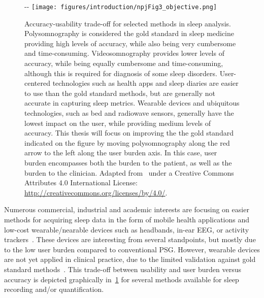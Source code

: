 \begin{figure}
\begin{adjustwidth*}{}{-\marginparwidth-\marginparsep}
    \centering
    \texttt{[image: figures/introduction/npjFig3\_objective.png]}
    \caption[Accuracy-usability trade-off in sleep analysis]{Accuracy-usability trade-off for selected methods in sleep analysis. Polysomnography is considered the gold standard in sleep medicine providing high levels of accuracy, while also being very cumbersome and time-consuming. Videosomnography provides lower levels of accuracy, while being equally cumbersome and time-consuming, although this is required for diagnosis of some sleep disorders. User-centered technologies such as health apps and sleep diaries are easier to use than the gold standard methods, but are generally not accurate in capturing sleep metrics. Wearable devices and ubiquitous technologies, such as bed and radiowave sensors, generally have the lowest impact on the user, while providing medium levels of accuracy. This thesis will focus on improving the the gold standard indicated on the figure by moving polysomnography along the red arrow to the left along the user burden axis. In this case, user burden encompasses both the burden to the patient, as well as the burden to the clinician. Adapted from~\cite{Perez-Pozuelo2020} under a Creative Commons Attributes 4.0 International License: \url{http://creativecommons.org/licenses/by/4.0/}.}
    \label{fig:introduction:figure-02}
\end{adjustwidth*}
\end{figure}

Numerous commercial, industrial and academic interests are focusing on easier methods for acquiring sleep data in the form of mobile health applications and low-cost wearable/nearable devices such as headbands, in-ear \ac{EEG}, or activity trackers~\cite{Perez-Pozuelo2020}.
These devices are interesting from several standpoints, but mostly due to the low user burden compared to conventional \ac{PSG}.
However, wearable devices are not yet applied in clinical practice, due to the limited validation against gold standard methods~\cite{Depner2019}.
This trade-off between usability and user burden versus accuracy is depicted graphically in~\cref{fig:introduction:figure-02} for several methods available for sleep recording and/or quantification.%

